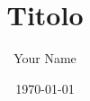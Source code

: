\documentclass{article}
\begin{document}
\title{Titolo}
\author{Your Name}
\date{\today}
\maketitle

\end{document}
